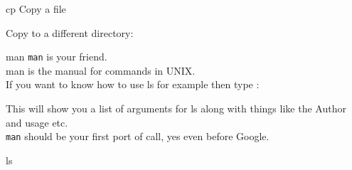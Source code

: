 \documentclass{beamer}
\begin{document}
\begin{frame}{cp}
Copy a file\\
\begin{center}
\end{center}
Copy to a different directory:
\begin{center}
\end{center}
\end{frame}

\begin{frame}{man}
\texttt{man} is your friend.\\man is the manual for commands in UNIX.\\If you want to know how to use ls for example then type : 
\begin{center}
\end{center}
This will show you a list of arguments for ls along with things like the Author and usage etc.\\
\texttt{man} should be your first port of call, yes even before Google.
\end{frame}

\begin{frame}{ls}
\end{frame}
\end{document}
